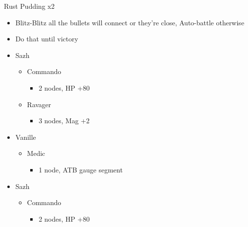 \begin{paracol}{2}
\begin{battle}{Rust Pudding x2}
\begin{itemize}
			      \begin{itemize}
				      \item Blitz-Blitz all the bullets will connect or they're close, Auto-battle otherwise
				      \item Do that until victory
			      \end{itemize}
		\end{itemize}
	\end{battle}
	\switchcolumn*
	\begin{menu}
		\begin{itemize}
			\crystarium
			\begin{itemize}
				\item Sazh
				      \begin{itemize}
					      \item Commando
					            \begin{itemize}
						            \item 2 nodes, HP +80
					            \end{itemize}
					      \item Ravager
					            \begin{itemize}
						            \item 3 nodes, Mag +2
					            \end{itemize}
				      \end{itemize}
				\item Vanille
				      \begin{itemize}
					      \item Medic
					            \begin{itemize}
						            \item 1 node, ATB gauge segment
					            \end{itemize}
				      \end{itemize}
			\end{itemize}
		\end{itemize}
	\end{menu}
	\switchcolumn
	\begin{menu}
		\begin{itemize}
			\crystarium
			\begin{itemize}
				\item Sazh
				      \begin{itemize}
					      \item Commando
					            \begin{itemize}
						            \item 2 nodes, HP +80

\end{itemize}
\end{itemize}
\end{itemize}
\end{itemize}
\end{menu}
\end{paracol}
